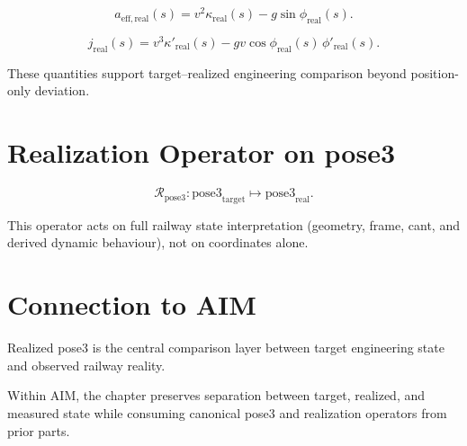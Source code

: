 \begin{definition}
\label{def:realized-effective-lateral-acceleration}
\[
a_{\mathrm{eff,real}}(s)
=
v^2\kappa_{\mathrm{real}}(s)-g\sin\phi_{\mathrm{real}}(s).
\]
\end{definition}

\begin{definition}
\label{def:realized-jerk}
\[
j_{\mathrm{real}}(s)
=
v^3\kappa'_{\mathrm{real}}(s)-gv\cos\phi_{\mathrm{real}}(s)\,\phi'_{\mathrm{real}}(s).
\]
\end{definition}

These quantities support target--realized engineering comparison beyond
position-only deviation.

\section{Realization Operator on pose3}

\begin{definition}
\label{def:pose3-realization-operator}
\[
\mathcal R_{\mathrm{pose3}}:
\mathrm{pose3}_{\mathrm{target}}
\mapsto
\mathrm{pose3}_{\mathrm{real}}.
\]
\end{definition}

This operator acts on full railway state interpretation (geometry,
frame, cant, and derived dynamic behaviour), not on coordinates alone.

\section{Connection to AIM}

\begin{summary}
Realized pose3 is the central comparison layer between target
engineering state and observed railway reality.

Within AIM, the chapter preserves separation between target, realized,
and measured state while consuming canonical pose3 and realization
operators from prior parts.
\end{summary}

